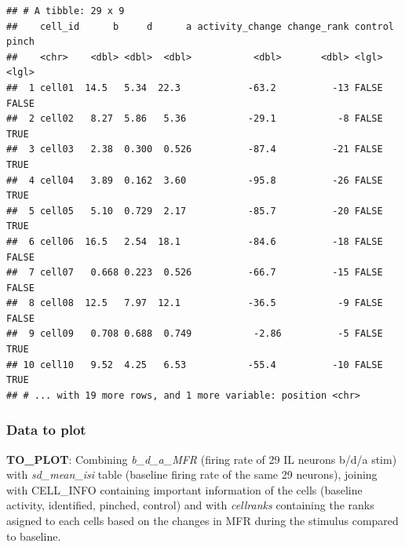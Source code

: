 \documentclass[12pt,]{article}
\newenvironment{Shaded}{\begin{snugshade}}{\end{snugshade}}
\newcommand{\DataTypeTok}[1]{\textcolor[rgb]{0.13,0.29,0.53}{#1}}
\newcommand{\DecValTok}[1]{\textcolor[rgb]{0.00,0.00,0.81}{#1}}
\newcommand{\KeywordTok}[1]{\textcolor[rgb]{0.13,0.29,0.53}{\textbf{#1}}}
\newcommand{\NormalTok}[1]{#1}
\newcommand{\OperatorTok}[1]{\textcolor[rgb]{0.81,0.36,0.00}{\textbf{#1}}}
\newcommand{\OtherTok}[1]{\textcolor[rgb]{0.56,0.35,0.01}{#1}}
\newcommand{\StringTok}[1]{\textcolor[rgb]{0.31,0.60,0.02}{#1}}
\begin{document}
\begin{verbatim}
## # A tibble: 29 x 9
##    cell_id      b     d      a activity_change change_rank control pinch
##    <chr>    <dbl> <dbl>  <dbl>           <dbl>       <dbl> <lgl>   <lgl>
##  1 cell01  14.5   5.34  22.3            -63.2          -13 FALSE   FALSE
##  2 cell02   8.27  5.86   5.36           -29.1           -8 FALSE   TRUE 
##  3 cell03   2.38  0.300  0.526          -87.4          -21 FALSE   TRUE 
##  4 cell04   3.89  0.162  3.60           -95.8          -26 FALSE   TRUE 
##  5 cell05   5.10  0.729  2.17           -85.7          -20 FALSE   TRUE 
##  6 cell06  16.5   2.54  18.1            -84.6          -18 FALSE   FALSE
##  7 cell07   0.668 0.223  0.526          -66.7          -15 FALSE   FALSE
##  8 cell08  12.5   7.97  12.1            -36.5           -9 FALSE   FALSE
##  9 cell09   0.708 0.688  0.749           -2.86          -5 FALSE   TRUE 
## 10 cell10   9.52  4.25   6.53           -55.4          -10 FALSE   TRUE 
## # ... with 19 more rows, and 1 more variable: position <chr>
\end{verbatim}

\hypertarget{data-to-plot}{%
\subsubsection{Data to plot}\label{data-to-plot}}

\textbf{TO\_PLOT}: Combining \emph{b\_d\_a\_MFR} (firing rate of 29 IL
neurons b/d/a stim) with \emph{sd\_mean\_isi} table (baseline firing
rate of the same 29 neurons), joining with CELL\_INFO containing
important information of the cells (baseline activity, identified,
pinched, control) and with \emph{cellranks} containing the ranks asigned
to each cells based on the changes in MFR during the stimulus compared
to baseline.

\begin{Shaded}
\end{Shaded}
\end{document}
